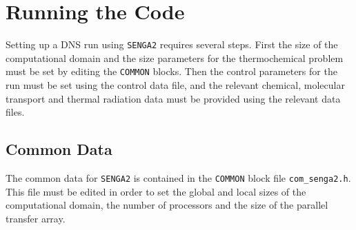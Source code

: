 \documentclass[dvips]{article}
\begin{document}
\section{Running the Code}
Setting up a DNS run using {\tt SENGA2} requires several steps.  First
the size of the computational domain and the size parameters for the
thermochemical problem must be set by editing the {\tt COMMON} blocks.  Then
the control parameters for the run must be set using the control data
file, and the relevant chemical, molecular transport and thermal radiation data
must be provided using the relevant data files.

\subsection{Common Data}
The common data for {\tt SENGA2} is contained in the {\tt COMMON} block file
{\tt com\_senga2.h}.  This file must be edited in order to set the global
and local sizes of the computational domain, the number of processors and
the size of the parallel transfer array.
\end{document}
